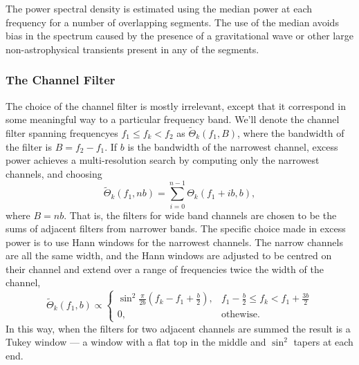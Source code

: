 \documentclass[10pt]{article}
\begin{document}
The power spectral density is estimated using the median power at each
frequency for a number of overlapping segments.  The use of the median
avoids bias in the spectrum caused by the presence of a gravitational wave
or other large non-astrophysical transients present in any of the segments. 


\subsubsection{The Channel Filter}
\label{sec:channelfilter}


The choice of the channel filter is mostly irrelevant, except that it
correspond in some meaningful way to a particular frequency band.  We'll
denote the channel filter spanning frequencyes \(f_{1} \leq f_{k} < f_{2}\)
as \(\tilde{\Theta}_{k}(f_{1}, B)\), where the bandwidth of the filter is
\(B = f_{2} - f_{1}\).  If \(b\) is the bandwidth of the narrowest channel,
excess power achieves a multi-resolution search by computing only the
narrowest channels, and choosing
\begin{equation}
\tilde{\Theta}_{k}(f_{1}, n b)
   = \sum_{i = 0}^{n - 1} \Theta_{k}(f_{1} + i b, b),
\end{equation}
where \(B = n b\).  That is, the filters for wide band channels are chosen
to be the sums of adjacent filters from narrower bands.  The specific
choice made in excess power is to use Hann windows for the narrowest
channels.  The narrow channels are all the same width, and the Hann windows
are adjusted to be centred on their channel and extend over a range of
frequencies twice the width of the channel,
\begin{equation}
\tilde{\Theta}_{k}(f_{1}, b)
   \propto \begin{cases}
   \sin^{2} \frac{\pi}{2 b} (f_{k} - f_{1} + \frac{b}{2}), & f_{1} -
   \frac{b}{2} \leq f_{k} < f_{1} + \frac{3 b}{2} \\
   0, & \text{othewise}.
   \end{cases}
\end{equation}
In this way, when the filters for two adjacent channels are summed the
result is a Tukey window --- a window with a flat top in the middle and
\(\sin^{2}\) tapers at each end.
\end{document}

